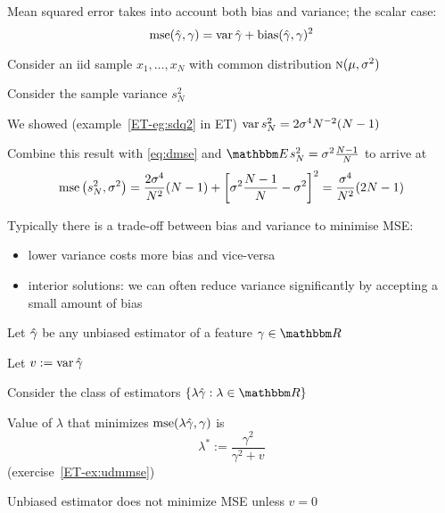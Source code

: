 \begin{frame}

    \vspace{2em}
    Mean squared error takes into account both bias and variance; the scalar case:
    \begin{equation}
        \label{eq:dmse}
        \operatorname{mse} (\hat \gamma, \gamma) = \operatorname{var} \hat \gamma + \text{bias}(\hat \gamma, \gamma)^2
    \end{equation}
    
    \vspace{.7em}
    \Eg
    Consider an {\sc iid} sample $x_1, \ldots,
    x_N$ with common distribution $\textrm{\sc n}(\mu, \sigma^2)$

    Consider the sample variance $s_N^2$
    
    We showed (example~\ref{ET-eg:sdq2} in ET) $\operatorname{var}  s^2_N
    = 2 \sigma^4 N^{-2} (N - 1)$
    
    Combine this result with
    \eqref{eq:dmse} and $\EE s^2_N = \sigma^2 \frac{N-1}{N}$ to arrive at
    \begin{equation*}
        \operatorname{mse} \left( s^2_N, \sigma^2 \right) 
        = \frac{2 \sigma^4}{N^2} (N - 1) 
        + \left[ \sigma^2 \frac{N-1}{N} - \sigma^2 \right]^2
        = \frac{\sigma^4}{N^2}  (2N - 1) 
    \end{equation*}
    
\end{frame}

\begin{frame}

    \vspace{2em}
    Typically there is a trade-off between bias and variance to minimise MSE:
    \begin{itemize}
        \item lower variance costs more bias and vice-versa
        \item interior solutions: we can often reduce variance significantly by
        accepting a small amount of bias
    \end{itemize}

\end{frame}

\begin{frame}

    \vspace{2em}
    \Eg
    Let $\hat \gamma$ be any unbiased estimator of a feature $\gamma \in \RR$
    
    Let $v := \operatorname{var} \hat \gamma$
    
    Consider the class of estimators $\setntn{ \lambda \hgamma
    }{\lambda \in \RR}$
    
    \vspace{.7em}
    Value of $\lambda$ that minimizes $\operatorname{mse}(\lambda \hat \gamma, \gamma)$ is
    \begin{equation}
        \label{eq:oeib}
        \lambda^* := \frac{\gamma^2}{\gamma^2 + v}
    \end{equation}
    (exercise~\ref{ET-ex:udmmse})
    
    Unbiased estimator does not minimize MSE unless $v = 0$

\end{frame}

